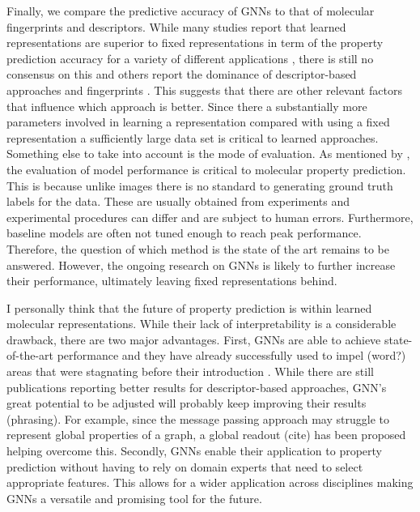 Finally, we compare the predictive accuracy of GNNs to that of molecular fingerprints and descriptors. While many studies report that learned representations are superior to fixed representations in term of the property prediction accuracy for a variety of different applications \citep{wu2018moleculenet,yangMPP, korolev}, there is still no consensus on this and others report the dominance of descriptor-based approaches and fingerprints \citep{mayr, jiang}. This suggests that there are other relevant factors that influence which approach is better. Since there a substantially more parameters involved in learning a representation compared with using a fixed representation a sufficiently large data set is critical to learned approaches. Something else to take into account is the mode of evaluation. As mentioned by \cite{SHEN201929}, the evaluation of model performance is critical to molecular property prediction. This is because unlike images there is no standard to generating ground truth labels for the data. These are usually obtained from experiments and experimental procedures can differ and are subject to human errors. Furthermore, baseline models are often not tuned enough to reach peak performance. Therefore, the question of which method is the state of the art remains to be answered. However, the ongoing research on GNNs is likely to further increase their performance, ultimately leaving fixed representations behind.


I personally think that the future of property prediction is within learned molecular representations. While their lack of interpretability is a considerable drawback, there are two major advantages. First, GNNs are able to achieve state-of-the-art performance and they have already successfully used to impel (word?) areas that were stagnating before their introduction \citep{STOKES2020688}. While there are still publications reporting better results for descriptor-based approaches, GNN's great potential to be adjusted will probably keep improving their results (phrasing). For example, since the message passing approach may struggle to represent global properties of a graph, a global readout (cite) has been proposed helping overcome this. Secondly, GNNs enable their application to property prediction without having to rely on domain experts that need to select appropriate features. This allows for a wider application across disciplines making GNNs a versatile and promising tool for the future. 

